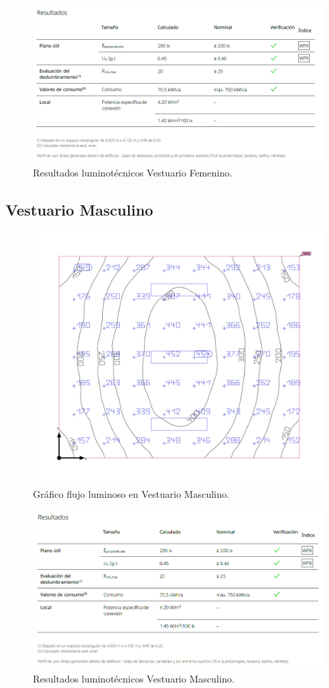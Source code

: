 \documentclass[../main.tex]{subfiles}
\begin{document}
\begin{figure}[H]
    \centering
    \includegraphics[width=0.75\linewidth]{Imagenes/Resultados Iluminacion Vestuario Femenino.png}
    \caption{Resultados luminotécnicos Vestuario Femenino.}
\end{figure}

\subsection{Vestuario Masculino}
\begin{figure}[H]
    \centering
    \includegraphics[width=0.5\linewidth]{Imagenes/Iluminacion Vestuario Masculino.png}
    \caption{Gráfico flujo luminoso en Vestuario Masculino.} 
\end{figure}

\begin{figure}[H]
    \centering
    \includegraphics[width=0.75\linewidth]{Imagenes/Resultados Iluminacion Vestuario Masculino.png}
    \caption{Resultados luminotécnicos Vestuario Masculino.}
\end{figure}
\end{document}
